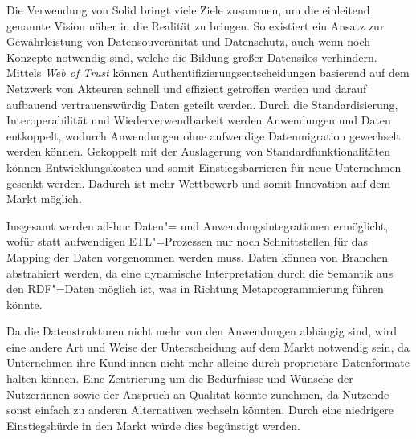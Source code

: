
Die Verwendung von Solid bringt viele Ziele zusammen, um die einleitend genannte Vision näher in die Realität zu bringen.
So existiert ein Ansatz zur Gewährleistung von Datensouveränität und Datenschutz, auch wenn noch Konzepte notwendig sind, welche die Bildung großer Datensilos verhindern.
Mittels \emph{Web of Trust} können Authentifizierungsentscheidungen basierend auf dem Netzwerk von Akteuren schnell und effizient getroffen werden und darauf aufbauend vertrauenswürdig Daten geteilt werden.
Durch die Standardisierung, Interoperabilität und Wiederverwendbarkeit werden Anwendungen und Daten entkoppelt, wodurch Anwendungen ohne aufwendige Datenmigration gewechselt werden können.
Gekoppelt mit der Auslagerung von Standardfunktionalitäten können Entwicklungskosten und somit Einstiegsbarrieren für neue Unternehmen gesenkt werden.
Dadurch ist mehr Wettbewerb und somit Innovation auf dem Markt möglich.

Insgesamt werden ad-hoc Daten"= und Anwendungsintegrationen ermöglicht, wofür statt aufwendigen ETL"=Prozessen nur noch Schnittstellen für das Mapping der Daten vorgenommen werden muss.
Daten können von Branchen abstrahiert werden, da eine dynamische Interpretation durch die Semantik aus den RDF"=Daten möglich ist, was in Richtung Metaprogrammierung führen könnte.

Da die Datenstrukturen nicht mehr von den Anwendungen abhängig sind, wird eine andere Art und Weise der Unterscheidung auf dem Markt notwendig sein, da Unternehmen ihre Kund:innen nicht mehr alleine durch proprietäre Datenformate halten können.
Eine Zentrierung um die Bedürfnisse und Wünsche der Nutzer:innen sowie der Anspruch an Qualität könnte zunehmen, da Nutzende sonst einfach zu anderen Alternativen wechseln könnten.
Durch eine niedrigere Einstiegshürde in den Markt würde dies begünstigt werden.
